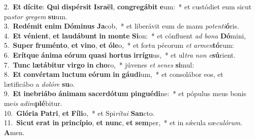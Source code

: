 {2.~}\textbf{Et} \textbf{dí}\textbf{ci}\textbf{te}: \textbf{Qui} \textbf{di}\textbf{spér}\textbf{sit} \textbf{Is}\textbf{ra}\textbf{ël}, \textbf{con}\textbf{gre}\textbf{gá}\textbf{bit} \textbf{e}um:~* et custódiet eum sicut pa\textit{stor} \textit{gre}\textit{gem} \textbf{su}um.\\
{3.~}\textbf{Re}\textbf{dé}\textbf{mit} \textbf{e}\textbf{nim} \textbf{Dó}\textbf{mi}\textbf{nus} \textbf{Ja}cob,~* et liberávit eum de manu \textit{po}\textit{ten}\textit{ti}\textbf{ó}ris.\\
{4.~}\textbf{Et} \textbf{vé}\textbf{ni}\textbf{ent}, \textbf{et} \textbf{lau}\textbf{dá}\textbf{bunt} \textbf{in} \textbf{mon}\textbf{te} \textbf{Si}on:~* et cónfluent \textit{ad} \textit{bo}\textit{na} \textbf{Dó}mini,\\
{5.~}\textbf{Su}\textbf{per} \textbf{fru}\textbf{mén}\textbf{to}, \textbf{et} \textbf{vi}\textbf{no}, \textbf{et} \textbf{ó}\textbf{le}o,~* et fœtu pécorum \textit{et} \textit{ar}\textit{men}\textbf{tó}rum:\\
{6.~}\textbf{E}\textbf{rít}\textbf{que} \textbf{á}\textbf{ni}\textbf{ma} \textbf{e}\textbf{ó}\textbf{rum} \textbf{qua}\textbf{si} \textbf{hor}\textbf{tus} \textbf{ir}\textbf{rí}\textbf{gu}us,~* et ul\textit{tra} \textit{non} \textit{e}\textbf{sú}rient.\\
{7.~}\textbf{Tunc} \textbf{læ}\textbf{tá}\textbf{bi}\textbf{tur} \textbf{vir}\textbf{go} \textbf{in} \textbf{cho}ro,~* júvenes \textit{et} \textit{se}\textit{nes} \textbf{si}mul:\\
{8.~}\textbf{Et} \textbf{con}\textbf{vér}\textbf{tam} \textbf{lu}\textbf{ctum} \textbf{e}\textbf{ó}\textbf{rum} \textbf{in} \textbf{gáu}\textbf{di}um,~* et consolábor eos, et lætificábo a \textit{do}\textit{ló}\textit{re} \textbf{su}o.\\
{9.~}\textbf{Et} \textbf{i}\textbf{ne}\textbf{bri}\textbf{á}\textbf{bo} \textbf{á}\textbf{ni}\textbf{mam} \textbf{sa}\textbf{cer}\textbf{dó}\textbf{tum} \textbf{pin}\textbf{gué}\textbf{di}ne:~* et pópulus meus bonis me\textit{is} \textit{a}\textit{dim}\textbf{plé}bitur.\\
{10.~}\textbf{Gló}\textbf{ri}\textbf{a} \textbf{Pa}\textbf{tri}, \textbf{et} \textbf{Fí}\textbf{li}o,~* et Spi\textit{rí}\textit{tu}\textit{i} \textbf{San}cto.\\
{11.~}\textbf{Si}\textbf{cut} \textbf{e}\textbf{rat} \textbf{in} \textbf{prin}\textbf{cí}\textbf{pi}\textbf{o}, \textbf{et} \textbf{nunc}, \textbf{et} \textbf{sem}per,~* et in sǽcula sæ\textit{cu}\textit{ló}\textit{rum}. \textbf{A}men.\\

